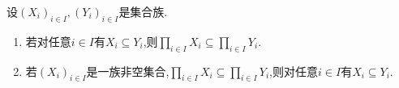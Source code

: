 \begin{corollary}{}{}
	设$\left(X_{i}\right)_{i\in I},\left(Y_{i}\right)_{i\in I}$是集合族.
	\begin{enumerate}
		\item 若对任意$i\in I$有$X_{i}\subseteq Y_{i}$,则$\prod\limits_{i\in I}X_{i}\subseteq\prod\limits_{i\in I}Y_{i}$.
		\item 若$\left(X_{i}\right)_{i\in I}$是一族非空集合,$\prod\limits_{i\in I}X_{i}\subseteq\prod\limits_{i\in I}Y_{i}$,则对任意$i\in I$有$X_{i}\subseteq Y_{i}$.
	\end{enumerate}
\end{corollary}

















































































































































